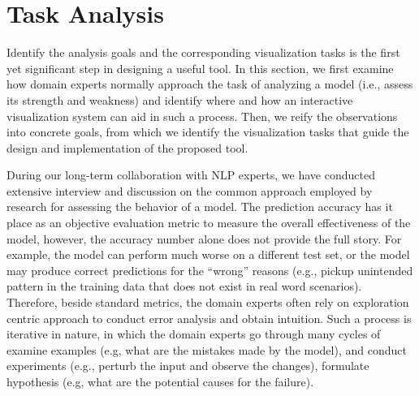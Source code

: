 \section{Task Analysis}
\label{sec:task}
Identify the analysis goals and the corresponding visualization tasks is the first yet significant step in designing a useful tool. In this section, we first examine how domain experts normally approach the task of analyzing a model (i.e., assess its strength and weakness) and identify where and how an interactive visualization system can aid in such a process.
Then, we reify the observations into concrete goals, from which we identify the visualization tasks that guide the design and implementation of the proposed tool.

During our long-term collaboration with NLP experts, we have conducted extensive interview and discussion on the common approach employed by research for assessing the behavior of a model.%
The prediction accuracy has it place as an objective evaluation metric to measure the overall effectiveness of the model, however, the accuracy number alone does not provide the full story. For example, the model can perform much worse on a different test set, or the model may produce correct predictions for the ``wrong'' reasons (e.g., pickup unintended pattern in the training data that does not exist in real word scenarios).
%
Therefore, beside standard metrics, the domain experts often rely on exploration centric approach to 
conduct error analysis and obtain intuition.
%
Such a process is iterative in nature, in which the domain experts go through many cycles of examine examples (e.g, what are the mistakes made by the model), and conduct experiments (e.g., perturb the input and observe the changes), formulate hypothesis (e.g, what are the potential causes for the failure).



